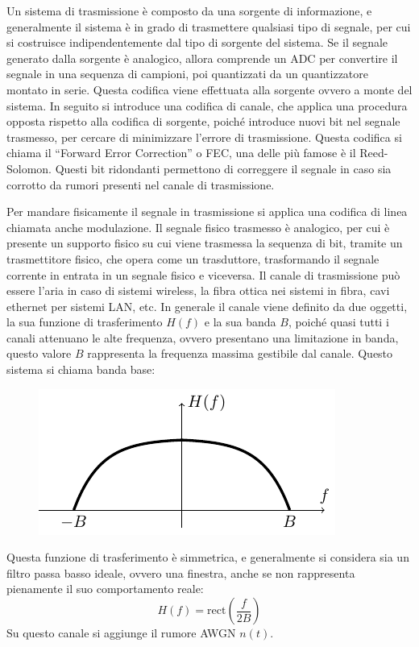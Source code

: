 \documentclass{article}
\newcommand{\rect}{\mathrm{rect}}
\numberwithin{equation}{subsection}
\begin{document}
Un sistema di trasmissione è composto da una sorgente di informazione, e generalmente il sistema è in grado di trasmettere qualsiasi tipo di segnale, per cui si costruisce 
indipendentemente dal tipo di sorgente del sistema. Se il segnale generato dalla sorgente è analogico, allora comprende un ADC per convertire il segnale in una sequenza 
di campioni, poi quantizzati da un quantizzatore montato in serie. 
Questa codifica viene effettuata alla sorgente ovvero a monte del sistema. 
In seguito si introduce una codifica di canale, che applica una procedura opposta rispetto alla codifica di sorgente, poiché introduce nuovi bit nel segnale trasmesso, 
per cercare di minimizzare l'errore di trasmissione. Questa codifica si chiama il ``Forward Error Correction'' o FEC, una delle più famose è il Reed-Solomon. 
Questi bit ridondanti permettono di correggere il segnale in caso sia corrotto da rumori presenti nel canale di trasmissione.  

Per mandare fisicamente il segnale in trasmissione si applica una codifica di linea chiamata anche modulazione. 
Il segnale fisico trasmesso è analogico, per cui è presente un supporto fisico su cui viene trasmessa la sequenza di bit, tramite un trasmettitore fisico, che opera come un 
trasduttore, trasformando il segnale corrente in entrata in un segnale fisico e viceversa. 
Il canale di trasmissione può essere l'aria in caso di sistemi wireless, la fibra ottica nei sistemi in fibra, cavi ethernet per sistemi LAN, 
etc. In generale il canale viene definito da due oggetti, la sua funzione di trasferimento $H(f)$ e la sua banda $B$, poiché quasi tutti i canali attenuano le alte frequenza, ovvero presentano 
una limitazione in banda, questo valore $B$ rappresenta la frequenza massima gestibile dal canale. Questo sistema si chiama banda base:
\begin{figure}[H]%
    \centering
    \includegraphics{funzione-canale.pdf}%
\end{figure}
Questa funzione di trasferimento è simmetrica, e generalmente si considera sia un filtro passa basso ideale, ovvero una finestra, anche se non rappresenta pienamente il 
suo comportamento reale:
\begin{equation*}
    H(f)=\displaystyle\rect\left(\frac{f}{2B}\right)
\end{equation*}
Su questo canale si aggiunge il rumore AWGN $n(t)$. 
\end{document}
